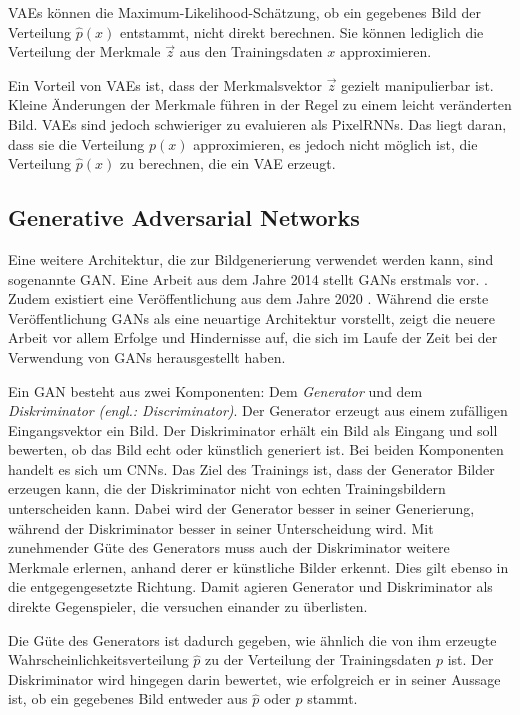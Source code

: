 \acp{VAE} können die Maximum-Likelihood-Schätzung, ob ein gegebenes Bild der Verteilung $\hat{p}(x)$ entstammt, nicht direkt berechnen. Sie können lediglich die Verteilung der Merkmale $\vec{z}$ aus den Trainingsdaten $x$ approximieren.

Ein Vorteil von \acsp{VAE} ist, dass der Merkmalsvektor $\vec{z}$ gezielt manipulierbar ist. Kleine Änderungen der Merkmale führen in der Regel zu einem leicht veränderten Bild. \acsp{VAE} sind jedoch schwieriger zu evaluieren als \acp{PixelRNN}. Das liegt daran, dass sie die Verteilung $p(x)$ approximieren, es jedoch nicht möglich ist, die Verteilung $\hat{p}(x)$ zu berechnen, die ein \acs{VAE} erzeugt. \cite{generativeModelsSurvey}

\label{chap:GANs}
\subsection{Generative Adversarial Networks}
Eine weitere Architektur, die zur Bildgenerierung verwendet werden kann, sind sogenannte \acs{GAN}. Eine Arbeit aus dem Jahre 2014 stellt \acp{GAN} erstmals vor. \cite{Goodfellow-GANs}. Zudem existiert eine Veröffentlichung aus dem Jahre 2020 \cite{GANs}. Während die erste Veröffentlichung \acp{GAN} als eine neuartige Architektur vorstellt, zeigt die neuere Arbeit vor allem Erfolge und Hindernisse auf, die sich im Laufe der Zeit bei der Verwendung von \acp{GAN} herausgestellt haben.

Ein \ac{GAN} besteht aus zwei Komponenten: Dem \emph{Generator} und dem \emph{Diskriminator} \emph{(engl.: Discriminator)}. Der Generator erzeugt aus einem zufälligen Eingangsvektor ein Bild. Der Diskriminator erhält ein Bild als Eingang und soll bewerten, ob das Bild echt oder künstlich generiert ist. Bei beiden Komponenten handelt es sich um \acp{CNN}. Das Ziel des Trainings ist, dass der Generator Bilder erzeugen kann, die der Diskriminator nicht von echten Trainingsbildern unterscheiden kann. Dabei wird der Generator besser in seiner Generierung, während der Diskriminator besser in seiner Unterscheidung wird. Mit zunehmender Güte des Generators muss auch der Diskriminator weitere Merkmale erlernen, anhand derer er künstliche Bilder erkennt. Dies gilt ebenso in die entgegengesetzte Richtung. Damit agieren Generator und Diskriminator als direkte Gegenspieler, die versuchen einander zu überlisten. \cite{GANs}

Die Güte des Generators ist dadurch gegeben, wie ähnlich die von ihm erzeugte Wahrscheinlichkeitsverteilung $\hat{p}$ zu der Verteilung der Trainingsdaten $p$ ist. Der Diskriminator wird hingegen darin bewertet, wie erfolgreich er in seiner Aussage ist, ob ein gegebenes Bild entweder aus $\hat{p}$ oder $p$ stammt. \cite{GANs}

